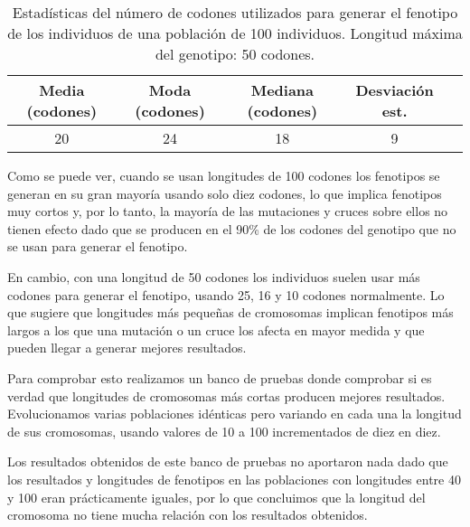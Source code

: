 \begin{table}[H]
\centering
\begin{tabular}{|c|c|c|c|c|}
\hline
\textbf{Media (codones)} & \textbf{Moda (codones)} & \textbf{Mediana (codones)} & \textbf{Desviación  est.} \\ \hline
20           & 24            & 18               & 9                      \\ \hline
\end{tabular}
\caption{Estadísticas del número de codones utilizados para generar el fenotipo de los individuos de una población de 100 individuos. Longitud máxima del genotipo: 50 codones.}
\end{table}

Como se puede ver, cuando se usan longitudes de 100 codones los fenotipos se generan en su gran mayoría usando solo diez codones, lo que implica fenotipos muy cortos y, por lo tanto, la mayoría de las mutaciones y cruces sobre ellos no tienen efecto dado que se producen en el 90\% de los codones del genotipo que no se usan para generar el fenotipo.

En cambio, con una longitud de 50 codones los individuos suelen usar más codones para generar el fenotipo, usando 25, 16 y 10 codones normalmente. Lo que sugiere que longitudes más pequeñas de cromosomas implican fenotipos más largos a los que una mutación o un cruce los afecta en mayor medida y que pueden llegar a generar mejores resultados.

Para comprobar esto realizamos un banco de pruebas donde comprobar si es verdad que longitudes de cromosomas más cortas producen mejores resultados. Evolucionamos varias poblaciones idénticas pero variando en cada una la longitud de sus cromosomas, usando valores de 10 a 100 incrementados de diez en diez.

Los resultados obtenidos de este banco de pruebas no aportaron nada dado que los resultados y longitudes de fenotipos en las poblaciones con longitudes entre 40 y 100 eran prácticamente iguales, por lo que concluimos que la longitud del cromosoma no tiene mucha relación con los resultados obtenidos.

